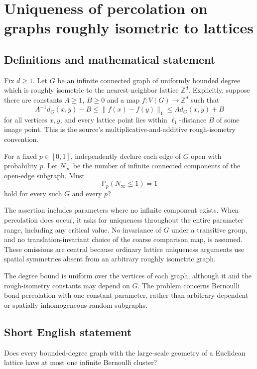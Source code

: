 \documentclass[11pt,a4paper]{article}
\begin{document}
\section*{Uniqueness of percolation on graphs roughly isometric to lattices}\label{statement}

\subsection{Definitions and mathematical statement}
Fix $d\ge1$. Let $G$ be an infinite connected graph of uniformly bounded degree which is roughly isometric to the nearest-neighbor lattice $\mathbb Z^d$. Explicitly, suppose there are constants $A\ge1$, $B\ge0$ and a map $f:V(G)\to\mathbb Z^d$ such that
\[
A^{-1}d_G(x,y)-B\le\|f(x)-f(y)\|_1\le A d_G(x,y)+B
\]
for all vertices $x,y$, and every lattice point lies within $\ell_1$-distance $B$ of some image point. This is the source's multiplicative-and-additive rough-isometry convention.

For a fixed $p\in[0,1]$, independently declare each edge of $G$ open with probability $p$. Let $N_\infty$ be the number of infinite connected components of the open-edge subgraph. Must
\[
\mathbb P_p(N_\infty\le1)=1
\]
hold for every such $G$ and every $p$?

The assertion includes parameters where no infinite component exists. When percolation does occur, it asks for uniqueness throughout the entire parameter range, including any critical value. No invariance of $G$ under a transitive group, and no translation-invariant choice of the coarse comparison map, is assumed. These omissions are central because ordinary lattice uniqueness arguments use spatial symmetries absent from an arbitrary roughly isometric graph.

The degree bound is uniform over the vertices of each graph, although it and the rough-isometry constants may depend on $G$. The problem concerns Bernoulli bond percolation with one constant parameter, rather than arbitrary dependent or spatially inhomogeneous random subgraphs.
\subsection{Short English statement}
Does every bounded-degree graph with the large-scale geometry of a Euclidean lattice have at most one infinite Bernoulli cluster?
\end{document}
